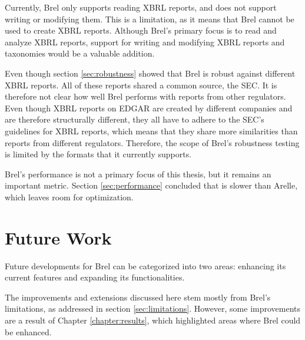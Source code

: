 Currently, Brel only supports reading XBRL reports, and does not support writing or modifying them.
This is a limitation, as it means that Brel cannot be used to create XBRL reports.
Although Brel's primary focus is to read and analyze XBRL reports,
support for writing and modifying XBRL reports and taxonomies would be a valuable addition.

Even though section \ref{sec:robustness} showed that Brel is robust against different XBRL reports.
All of these reports shared a common source, the SEC.
It is therefore not clear how well Brel performs with reports from other regulators.
Even though XBRL reports on EDGAR are created by different companies and are therefore structurally different,
they all have to adhere to the SEC's guidelines for XBRL reports, 
which means that they share more similarities than reports from different regulators.
Therefore, the scope of Brel's robustness testing is limited by the formats that it currently supports.

Brel's performance is not a primary focus of this thesis, but it remains an important metric.
Section \ref{sec:performance} concluded that is slower than Arelle, which leaves room for optimization.


\section{Future Work}

Future developments for Brel can be categorized into two areas: 
\textcolor{airforceblue}{enhancing its current features}
and 
\textcolor{turkishrose}{expanding its functionalities}. 

The improvements and extensions discussed here stem mostly from Brel's limitations, 
as addressed in section \ref{sec:limitations}.
However, some improvements are a result of Chapter \ref{chapter:results},
which highlighted areas where Brel could be enhanced.


